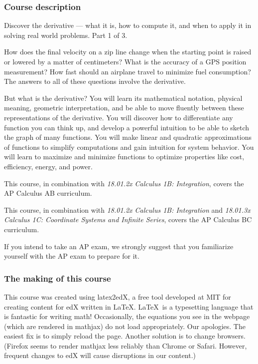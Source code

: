 \documentclass[pdftex, brazil, 12pt, twoside]{article}
\begin{document}
\subsubsection{Course description}
\label{gs-ol-description}

Discover the derivative --- what it is, how to compute it, and when to apply it in solving real world problems. Part 1 of 3.

How does the final velocity on a zip line change when the starting point is raised or lowered by a matter of centimeters? What is the accuracy of a GPS position measurement? How fast should an airplane travel to minimize fuel consumption? The answers to all of these questions involve the derivative.

But what is the derivative? You will learn its mathematical notation, physical meaning, geometric interpretation, and be able to move fluently between these representations of the derivative. You will discover how to differentiate any function you can think up, and develop a powerful intuition to be able to sketch the graph of many functions. You will make linear and quadratic approximations of functions to simplify computations and gain intuition for system behavior. You will learn to maximize and minimize functions to optimize properties like cost, efficiency, energy, and power.

This course, in combination with \emph{18.01.2x Calculus 1B: Integration}, covers the AP Calculus AB curriculum.

This course, in combination with \emph{18.01.2x Calculus 1B: Integration} and \emph{18.01.3x Calculus 1C: Coordinate Systems and Infinite Series}, covers the AP Calculus BC curriculum.

If you intend to take an AP exam, we strongly suggest that you familiarize yourself with the AP exam to prepare for it.

\subsubsection{The making of this course}
\label{gs-ol-making}

This course was created using latex2edX, a free tool developed at MIT for creating content for edX written in \LaTeX. \LaTeX\ is a typesetting language that is fantastic for writing math! Occasionally, the equations you see in the webpage (which are rendered in mathjax) do not load appropriately. Our apologies. The easiest fix is to simply reload the page. Another solution is to change browsers. (Firefox seems to render mathjax less reliably than Chrome or Safari. However, frequent changes to edX will cause disruptions in our content.)
\end{document}
